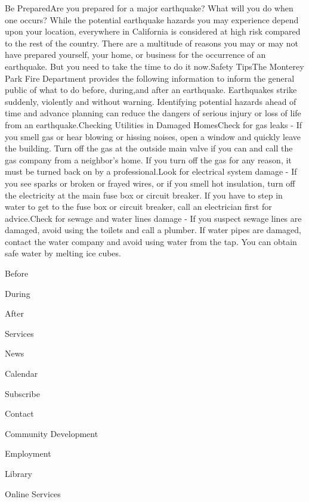 \documentclass[a4paper,11pt]{article}
\begin{document}
\begin{docenv}
{Be PreparedAre you prepared for a major earthquake? What will you do when one occurs? While the potential earthquake hazards you may experience depend upon your location, everywhere in California is considered at high risk compared to the rest of the country. There are a multitude of reasons you may or may not have prepared yourself, your home, or business for the occurrence of an earthquake. But you need to take the time to do it now.Safety TipsThe Monterey Park Fire Department provides the following information to inform the general public of what to do before, during,and after an earthquake. Earthquakes strike suddenly, violently and without warning. Identifying potential hazards ahead of time and advance planning can reduce the dangers of serious injury or loss of life from an earthquake.Checking Utilities in Damaged HomesCheck for gas leaks - If you smell gas or hear blowing or hissing noises, open a window and quickly leave the building. Turn off the gas at the outside main valve if you can and call the gas company from a neighbor's home. If you turn off the gas for any reason, it must be turned back on by a professional.Look for electrical system damage - If you see sparks or broken or frayed wires, or if you smell hot insulation, turn off the electricity at the main fuse box or circuit breaker. If you have to step in water to get to the fuse box or circuit breaker, call an electrician first for advice.Check for sewage and water lines damage - If you suspect sewage lines are damaged, avoid using the toilets and call a plumber. If water pipes are damaged, contact the water company and avoid using water from the tap. You can obtain safe water by melting ice cubes.

 
 
 

 

 

Before

During

After

 

 

Services

News

Calendar

Subscribe

Contact

 
 
 

 

Community Development

Employment

Library

 
 

Online Services}
\end{docenv}
\end{document}
